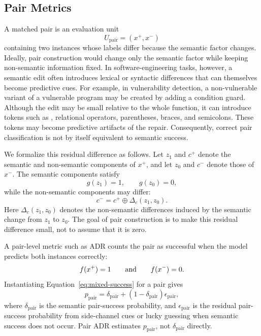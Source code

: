 \documentclass[acmsmall,screen,review,anonymous]{acmart}
\begin{document}

\subsection{Pair Metrics}
\label{sec:controlled-metrics:pair}

A matched pair is an evaluation unit
\[
U_{\mathrm{pair}}=(x^+,x^-)
\]
containing two instances whose labels differ because the semantic factor
changes. Ideally, pair construction would change only the semantic factor
while keeping non-semantic information fixed. In software-engineering tasks,
however, a semantic edit often introduces lexical or syntactic differences
that can themselves become predictive cues.
For example, in vulnerability detection, a
non-vulnerable variant of a vulnerable program may be created by adding a
condition guard. Although the edit may be small relative to the whole
function, it can introduce tokens such as , relational operators,
parentheses, braces, and semicolons. These tokens may become predictive
artifacts of the repair. Consequently, correct pair classification is not by
itself equivalent to semantic success.

We formalize this residual difference as follows. Let \(z_1\) and \(c^+\)
denote the semantic and non-semantic components of \(x^+\), and let \(z_0\)
and \(c^-\) denote those of \(x^-\). The semantic components satisfy
\[
g(z_1)=1,
\qquad
g(z_0)=0,
\]
while the non-semantic components may differ:
\[
c^- = c^+ \oplus \Delta_c(z_1,z_0).
\]
Here \(\Delta_c(z_1,z_0)\) denotes the non-semantic differences induced by
the semantic change from \(z_1\) to \(z_0\). The goal of pair construction is
to make this residual difference small, not to assume that it is zero.

A pair-level metric such as ADR counts the pair as successful when the model
predicts both instances correctly:
\[
f(x^+)=1
\qquad\text{and}\qquad
f(x^-)=0.
\]
Instantiating Equation~\eqref{eq:mixed-success} for a pair gives
\begin{equation}
\label{eq:pair-success}
p_{\mathrm{pair}}
=
\delta_{\mathrm{pair}}
+
(1-\delta_{\mathrm{pair}})\epsilon_{\mathrm{pair}},
\end{equation}
where \(\delta_{\mathrm{pair}}\) is the semantic pair-success probability,
and \(\epsilon_{\mathrm{pair}}\) is the residual pair-success probability
from side-channel cues or lucky guessing when semantic success does not occur.
Pair ADR estimates \(p_{\mathrm{pair}}\), not
\(\delta_{\mathrm{pair}}\) directly.
\end{document}
